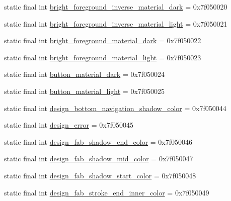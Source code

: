 \begin{DoxyCompactItemize}
\item 
static final int \mbox{\hyperlink{classandroid_1_1support_1_1design_1_1R_1_1color_a0f8c2acced8fd37241fd488cfb6a4397}{bright\+\_\+foreground\+\_\+inverse\+\_\+material\+\_\+dark}} = 0x7f050020
\item 
static final int \mbox{\hyperlink{classandroid_1_1support_1_1design_1_1R_1_1color_ab90e3df7107fcc71538465a8a2f95bd8}{bright\+\_\+foreground\+\_\+inverse\+\_\+material\+\_\+light}} = 0x7f050021
\item 
static final int \mbox{\hyperlink{classandroid_1_1support_1_1design_1_1R_1_1color_af7145fbb518203f5aa6ee291adca6389}{bright\+\_\+foreground\+\_\+material\+\_\+dark}} = 0x7f050022
\item 
static final int \mbox{\hyperlink{classandroid_1_1support_1_1design_1_1R_1_1color_ae39a16e83ec527288841137b165c2d3c}{bright\+\_\+foreground\+\_\+material\+\_\+light}} = 0x7f050023
\item 
static final int \mbox{\hyperlink{classandroid_1_1support_1_1design_1_1R_1_1color_a38c6561c22dceef627a0c105ca5b3273}{button\+\_\+material\+\_\+dark}} = 0x7f050024
\item 
static final int \mbox{\hyperlink{classandroid_1_1support_1_1design_1_1R_1_1color_ae5e7a4df8be00d0ffa75ddc098ff753c}{button\+\_\+material\+\_\+light}} = 0x7f050025
\item 
static final int \mbox{\hyperlink{classandroid_1_1support_1_1design_1_1R_1_1color_a1d8e47550e60233115241f5597fc54ea}{design\+\_\+bottom\+\_\+navigation\+\_\+shadow\+\_\+color}} = 0x7f050044
\item 
static final int \mbox{\hyperlink{classandroid_1_1support_1_1design_1_1R_1_1color_aae58418ebb70a39b6e4b07b7dc0fbd5a}{design\+\_\+error}} = 0x7f050045
\item 
static final int \mbox{\hyperlink{classandroid_1_1support_1_1design_1_1R_1_1color_a9ba19019371146377edd57f3fc7b3184}{design\+\_\+fab\+\_\+shadow\+\_\+end\+\_\+color}} = 0x7f050046
\item 
static final int \mbox{\hyperlink{classandroid_1_1support_1_1design_1_1R_1_1color_a80ff80abb78cf8c58d69390b7ae713eb}{design\+\_\+fab\+\_\+shadow\+\_\+mid\+\_\+color}} = 0x7f050047
\item 
static final int \mbox{\hyperlink{classandroid_1_1support_1_1design_1_1R_1_1color_ad75b8a513073855f5c7122eb4decf918}{design\+\_\+fab\+\_\+shadow\+\_\+start\+\_\+color}} = 0x7f050048
\item 
static final int \mbox{\hyperlink{classandroid_1_1support_1_1design_1_1R_1_1color_ae422c5b9bdcdfd3f3b12af9ea73d7502}{design\+\_\+fab\+\_\+stroke\+\_\+end\+\_\+inner\+\_\+color}} = 0x7f050049

\end{DoxyCompactItemize}
